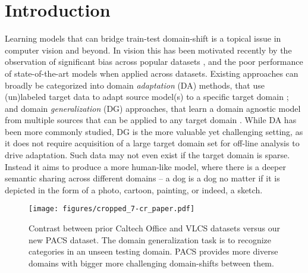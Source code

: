 \documentclass[10pt,twocolumn,letterpaper]{article}
\begin{document}
\section{Introduction}
Learning models that can bridge train-test domain-shift is a topical issue in computer vision and beyond. In vision this has been motivated recently by the observation of significant bias across popular datasets \cite{torralba2011dataset_bias}, and the poor performance of state-of-the-art models when applied across datasets. Existing approaches can broadly be categorized into domain \emph{adaptation} (DA) methods, that use (un)labeled target data to adapt source model(s) to a specific target domain \cite{saenko2010domainAdapt}; and domain \emph{generalization} (DG) approaches, that learn a domain agnostic model from multiple sources that can be applied to any target domain \cite{ECCV12_Khosla,ghifary2015domain}. While DA has been more commonly studied,  DG is the more valuable yet challenging setting, as it does not require acquisition of a large target domain set for off-line analysis to drive adaptation. Such data may not even exist if the target domain is sparse. Instead it aims to produce a more human-like model, where there is a deeper semantic sharing across different domains -- a dog is a dog no matter if it is depicted in the form of a photo, cartoon, painting, or indeed, a sketch. 

\begin{figure}[t]
\texttt{[image: figures/cropped\_7-cr\_paper.pdf]}
\caption{Contrast between prior Caltech Office and VLCS datasets versus our new PACS dataset. The domain generalization task is to recognize categories in an unseen testing domain. PACS provides more diverse domains with bigger more challenging domain-shifts between them. }\label{fig:datasetSummary}
\end{figure}
\end{document}
